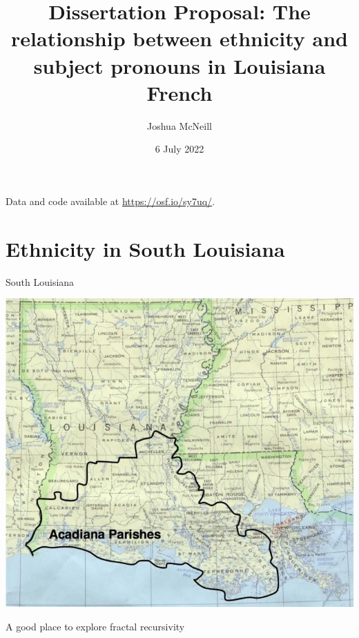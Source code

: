 \documentclass{beamer}\usepackage[]{graphicx}\usepackage[]{xcolor}
\title[Ethnicity and subject pronouns]{Dissertation Proposal: The relationship between ethnicity and subject pronouns in Louisiana French}
\author{Joshua McNeill}
\institute{University of Georgia}
\date{6 July 2022}
\begin{document}
  \begin{frame}
    \titlepage
    \tiny{
      Data and code available at \url{https://osf.io/sy7uq/}.
    }
  \end{frame}

  \begin{frame}
    \tableofcontents[hideallsubsections]
  \end{frame}


  \section{Ethnicity in South Louisiana}
    \begin{frame}{South Louisiana}
      \begin{center}
        \includegraphics[scale=0.27]{acadiana.jpg}
      \end{center}
      A good place to explore fractal recursivity \parencite{irvine_language_2000}
    \end{frame}
\end{document}
